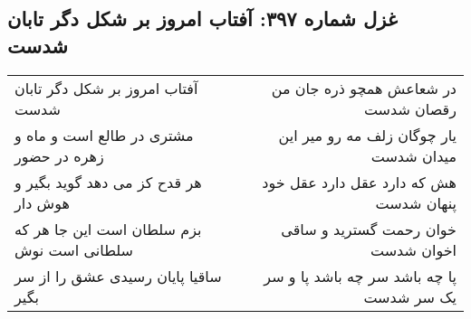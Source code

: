 \begin{center}
\section*{غزل شماره ۳۹۷: آفتاب امروز بر شکل دگر تابان شدست}
\label{sec:0397}
\begin{longtable}{l p{0.5cm} r}
آفتاب امروز بر شکل دگر تابان شدست
&&
در شعاعش همچو ذره جان من رقصان شدست
\\
مشتری در طالع است و ماه و زهره در حضور
&&
یار چوگان زلف مه رو میر این میدان شدست
\\
هر قدح کز می دهد گوید بگیر و هوش دار
&&
هش که دارد عقل دارد عقل خود پنهان شدست
\\
بزم سلطان است این جا هر که سلطانی است نوش
&&
خوان رحمت گسترید و ساقی اخوان شدست
\\
ساقیا پایان رسیدی عشق را از سر بگیر
&&
پا چه باشد سر چه باشد پا و سر یک سر شدست
\\
\end{longtable}
\end{center}
